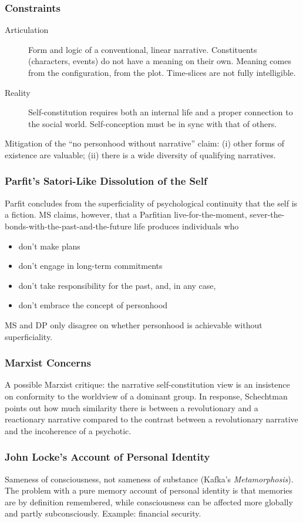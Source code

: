 \documentclass[xcolor=dvipsnames]{beamer}
\begin{document}
\begin{frame}
  \frametitle{Constraints}
  \begin{description}
  \item[Articulation] Form and logic of a conventional, linear
    narrative. Constituents (characters, events) do not have a meaning
    on their own. Meaning comes from the configuration, from the plot.
    Time-slices are not fully intelligible. 
  \item[Reality] Self-constitution requires both an internal life and
    a proper connection to the social world. Self-conception must be
    in sync with that of others.
  \end{description}
  Mitigation of the ``no personhood without narrative'' claim: (i)
  other forms of existence are valuable; (ii) there is a wide
  diversity of qualifying narratives.
\end{frame}

\begin{frame}
  \frametitle{Parfit's Satori-Like Dissolution of the Self}
  Parfit concludes from the superficiality of psychological continuity
  that the self is a fiction. MS claims, however, that a Parfitian
  live-for-the-moment, sever-the-bonds-with-the-past-and-the-future
  life produces individuals who
  \begin{itemize}
  \item don't make plans
  \item don't engage in long-term commitments
  \item don't take responsibility for the past, and, in any case,
  \item don't embrace the concept of personhood
  \end{itemize}
  MS and DP only disagree on whether personhood is achievable without superficiality.
\end{frame}

\begin{frame}
  \frametitle{Marxist Concerns}
  A possible Marxist critique: the narrative self-constitution view is
  an insistence on conformity to the worldview of a dominant group. In
  response, Schechtman points out how much similarity there is between
  a revolutionary and a reactionary narrative compared to the contrast
  between a revolutionary narrative and the incoherence of a psychotic.
\end{frame}

\begin{frame}
  \frametitle{John Locke's Account of Personal Identity}
  Sameness of consciousness, not sameness of substance (Kafka's
  \emph{Metamorphosis}). The problem with a pure memory account of
  personal identity is that memories are by definition remembered,
  while consciousness can be affected more globally and partly
  subconsciously. Example: financial security.
\end{frame}
\end{document}
